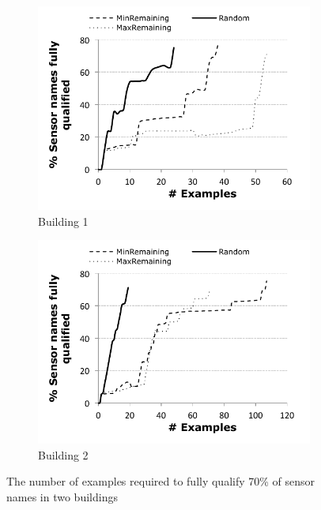 \begin{figure}[h!]
\centering
	\begin{subfigure}{0.48\textwidth}
                \centering
		\includegraphics[width=\textwidth]{./figs/soda-active-learning.pdf}
                \caption{Building 1}
                \label{fig:active-learning-soda}
	\end{subfigure}
	\begin{subfigure}{0.48\textwidth}
                \centering
		\includegraphics[width=\textwidth]{./figs/sdh-active-learning.pdf}
                \caption{Building 2}
                \label{fig:active-learning-sdh}
	\end{subfigure}
\caption{The number of examples required to fully qualify 70\% of sensor names in two buildings}
\label{fig:active-learning}
\end{figure}



